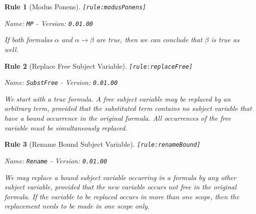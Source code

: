 \documentclass[a4paper,german,10pt,twoside]{book}
\newtheorem{rul}{Rule}
\theoremstyle{definition}
\theoremstyle{remark}
\begin{document}
\begin{rul}[Modus Ponens]
\label{rule:modusPonens} \hypertarget{rule:modusPonens}{}
{\tt \tiny [\verb]rule:modusPonens]]}

\par
{\em   Name: \verb]MP]  -  Version: \verb]0.01.00]}


If both formulas $\alpha$ and $\alpha \rightarrow \beta$ are true, then we can conclude that $\beta$ is true as well.
\end{rul}


\begin{rul}[Replace Free Subject Variable]
\label{rule:replaceFree} \hypertarget{rule:replaceFree}{}
{\tt \tiny [\verb]rule:replaceFree]]}

\par
{\em   Name: \verb]SubstFree]  -  Version: \verb]0.01.00]}


We start with a true formula.
A free subject variable may be replaced by an arbitrary term, provided that the substituted term contains no subject variable that have a bound occurrence in the original formula. All occurrences of the free variable must be simultaneously replaced.
\end{rul}


\begin{rul}[Rename Bound Subject Variable]
\label{rule:renameBound} \hypertarget{rule:renameBound}{}
{\tt \tiny [\verb]rule:renameBound]]}

\par
{\em   Name: \verb]Rename]  -  Version: \verb]0.01.00]}


We may replace a bound subject variable occurring in a formula by any other subject variable, provided that the new variable occurs not free in the original formula. If the variable to be replaced occurs in more than one scope, then the replacement needs to be made in one scope only.
\end{rul}
\end{document}
